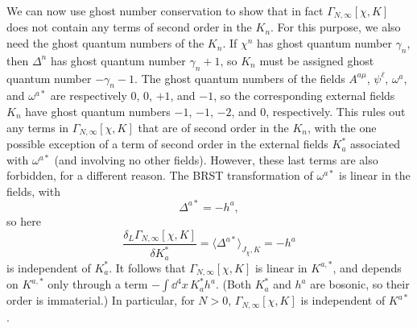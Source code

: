 We can now use ghost number conservation to show that in fact $\Gamma_{N,\infty}[\chi,K]$ does not contain any terms of second order in the $K_n$. For this purpose, we also need the ghost quantum numbers of the $K_n$. If $\chi^n$ has ghost quantum number $\gamma_n$, then $\Delta^n$ has ghost quantum number $\gamma_n+1$, so $K_n$ must be assigned ghost quantum number $-\gamma_n-1$. The ghost quantum numbers of the fields $A^{a\mu}$, $\psi^\ell$, $\omega^a$, and $\omega^{a *}$ are respectively $0$, $0$, $+1$, and $-1$, so the corresponding external fields $K_n$ have ghost quantum numbers $-1$, $-1$, $-2$, and $0$, respectively. This rules out any terms in $\Gamma_{N,\infty}[\chi,K]$ that are of second order in the $K_n$, with the one possible exception of a term of second order in the external fields $K_a^*$ associated with $\omega^{a *}$ (and involving no other fields). However, these last terms are also forbidden, for a different reason. The BRST transformation of $\omega^{a *}$ is linear in the fields, with
\begin{equation}
\Delta^{a *}=-h^a,
\tag{17.2.4}\label{eq:17.2.4}
\end{equation}
so here
\[
\frac{\delta_L\Gamma_{N,\infty}[\chi,K]}{\delta K_a^*}
=\langle\Delta^{a *}\rangle_{J_\chi,K}=-h^a
\]
is independent of $K_a^*$. It follows that $\Gamma_{N,\infty}[\chi,K]$ is linear in $K^{a,*}$, and depends on $K^{a,*}$ only through a term $-\int \dd^4x\,K_a^*h^a$. (Both $K_a^*$ and $h^a$ are bosonic, so their order is immaterial.) In particular, for $N>0$, $\Gamma_{N,\infty}[\chi,K]$ is independent of $K^{a*}$.

